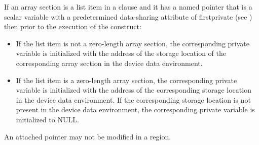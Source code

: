\begin{ccppspecific}


If an array section is a list item in a  clause and it has a named
pointer that is a scalar variable with a predetermined data-sharing attribute
of firstprivate (see )
then prior to the execution of the construct:

\begin{itemize}

\item If the list item is not a zero-length array section, the corresponding
private variable is initialized with the address of the storage location of the
corresponding array section in the device data environment.

\item If the list item is a zero-length array section, the corresponding private
variable is initialized with the address of the corresponding storage location
in the device data environment.  If the corresponding storage location is not
present in the device data environment, the corresponding private variable
is initialized to NULL.  

\end{itemize}

\item An attached pointer may not be modified in a  region.


\end{ccppspecific}

